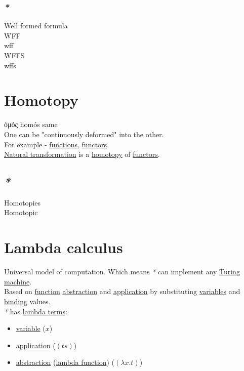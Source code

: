 \documentclass[a4paper,14pt,oneside]{book}
\begin{document}
\subsection{\emph{*}}
\label{sec:org973c58a}
\label{orga52e806}Well formed formula\\
\label{org976fc29}WFF\\
\label{orgcc2a98f}wff\\
\label{org2049200}WFFS\\
\label{org8c19800}wffs\\

\chapter{\label{org419c2b6}Homotopy}
\label{sec:org6642117}
ὁμός homós same\\

One can be "continuously deformed" into the other.\\

For example - \hyperref[orgad455e4]{functions}, \hyperref[org8ff5d50]{functors}.\\
\hyperref[orgd461988]{Natural transformation} is a \hyperref[org419c2b6]{homotopy} of \hyperref[org8ff5d50]{functors}.\\

\section{\emph{*}}
\label{sec:org0049ddb}

\label{orgf329ed3}Homotopies\\
\label{org12e6439}Homotopic\\

\chapter{\label{org293c423}Lambda calculus}
\label{sec:org8f7568f}
Universal model of computation. Which means \emph{*} can implement any \hyperref[org2817b6b]{Turing machine}.\\
Based on \hyperref[orgad0a745]{function} \hyperref[org4b78719]{abstraction} and \hyperref[org5049d91]{application} by substituting \hyperref[org4277fa3]{variables} and \hyperref[orgb9789ac]{binding} values.\\

\emph{*} has \hyperref[org4000e29]{lambda terms}:\\
\begin{itemize}
\item \hyperref[orgbfc0143]{variable} (\(x\))\\
\item \hyperref[org5049d91]{application} (\((ts)\))\\
\item \hyperref[org4b78719]{abstraction} (\hyperref[org64af4b4]{lambda function}) (\((\lambda x . t)\))\\
\end{itemize}
\end{document}
